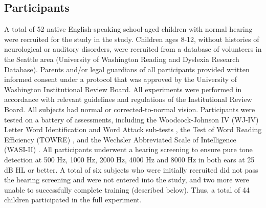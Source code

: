 \documentclass[../uwthesis.tex]{subfiles}
\begin{document}
\subsection{Participants}
A total of 52 native English-speaking school-aged children with normal hearing were
recruited for the study in the study. Children ages 8-12, without histories of neurological or auditory disorders, were recruited from a database of volunteers in the Seattle area (University of Washington Reading and Dyslexia Research Database). Parents and/or legal guardians of all participants provided written informed consent under a protocol that was approved by the University of Washington Institutional Review Board. All experiments were performed in accordance with relevant guidelines and regulations of the Institutional Review Board. All subjects had normal or corrected-to-normal vision. Participants were tested on a battery of assessments, including the Woodcock-Johnson IV (WJ-IV) Letter Word Identification and Word Attack sub-tests \cite{Schrank2014Woodcock-JohnsonAchievement}, the Test of Word Reading Efficiency (TOWRE) \cite{Torgesen2011TOWREEfficiency}, and the Wechsler Abbreviated Scale of Intelligence (WASI-II) \cite{Wechsler2011WechslerManual.}. All participants underwent a hearing screening to ensure pure tone detection at 500 Hz, 1000 Hz, 2000 Hz, 4000 Hz and 8000 Hz in both ears at 25 dB HL or better. A total of six subjects who were initially recruited did not pass the hearing screening and were not entered into the study, and two more were unable to successfully complete training (described below). Thus, a total of 44 children participated in the full experiment.
\end{document}
